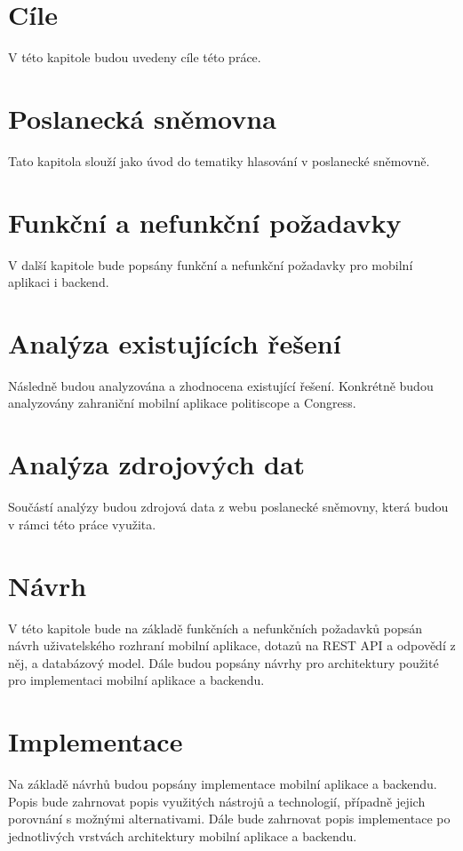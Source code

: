 \documentclass[czech,master,unicode]{ctufit-thesis}
\theoremstyle{plain}
\theoremstyle{definition}
\theoremstyle{remark}
\numberwithin{theorem}{chapter}
\begin{document}
\begin{summarypage}
	
\section*{Cíle}
V této kapitole budou uvedeny cíle této práce.

\section*{Poslanecká sněmovna}
Tato kapitola slouží jako úvod do tematiky hlasování v poslanecké sněmovně.

\section*{Funkční a nefunkční požadavky}
V další kapitole bude popsány funkční a nefunkční požadavky pro mobilní aplikaci i backend.

\section*{Analýza existujících řešení}
Následně budou analyzována a zhodnocena existující řešení. Konkrétně budou analyzovány zahraniční mobilní aplikace politiscope a Congress.

\section*{Analýza zdrojových dat}
Součástí analýzy budou zdrojová data z webu poslanecké sněmovny, která budou v rámci této práce využita.

\section*{Návrh}
V této kapitole bude na základě funkčních a nefunkčních požadavků popsán návrh uživatelského rozhraní mobilní aplikace, dotazů na REST API a odpovědí z něj, a databázový model. Dále budou popsány návrhy pro architektury použité pro implementaci mobilní aplikace a backendu.

\section*{Implementace}
Na základě návrhů budou popsány implementace mobilní aplikace a backendu. Popis bude zahrnovat popis využitých nástrojů a technologií, případně jejich porovnání s možnými alternativami. Dále bude zahrnovat popis implementace po jednotlivých vrstvách architektury mobilní aplikace a backendu.


\end{summarypage}
\end{document}
